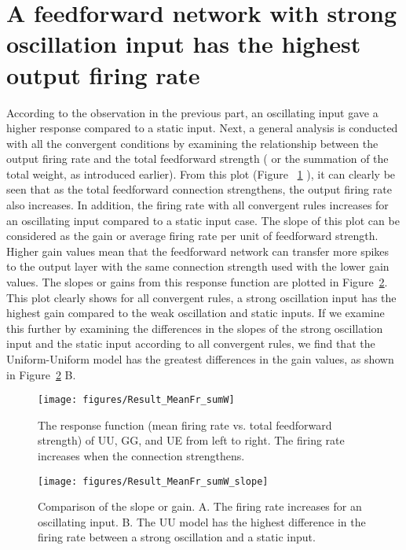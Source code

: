\section{A feedforward network with strong oscillation input has the highest output firing rate}
 According to the observation in the previous part, an oscillating input gave a higher response compared to a static input. Next, a general analysis is conducted with all the convergent conditions by examining the relationship between the output firing rate and the total feedforward strength ( or the summation of the total weight, as introduced earlier).  From this plot (Figure ~\ref{fig:ResFun} ), it can clearly be seen that as the total feedforward connection strengthens, the output firing rate also increases.
 In addition, the firing rate with all convergent rules increases for an oscillating input compared to a static input case. The slope of this plot can be considered as the gain or average firing rate per unit of feedforward strength.  Higher gain values mean that the feedforward network can transfer more spikes to the output layer with the same connection strength used with the lower gain values. The slopes or gains from this response function are plotted in Figure~\ref{fig:ResFunDiff}. This plot clearly shows for all convergent rules, a strong oscillation  input has the highest gain compared to the weak oscillation and static inputs.  If we examine this further by examining the differences in the slopes of the strong oscillation input and the static input according to all convergent rules, we find that the Uniform-Uniform model has the greatest differences in the gain values, as shown in Figure~\ref{fig:ResFunDiff} B. 


\begin{figure}[!h]
	\centering
	\texttt{[image: figures/Result\_MeanFr\_sumW]}
	\caption{The response function (mean firing rate vs. total feedforward strength) of UU, GG, and UE from left to right. The firing rate increases when the connection strengthens.}
	\label{fig:ResFun}
\end{figure}


\begin{figure}[!h]
	\centering
	\texttt{[image: figures/Result\_MeanFr\_sumW\_slope]}
	\caption{Comparison of the slope or gain. A. The firing rate increases for an oscillating input. B. The UU model has the highest difference in the firing rate between a strong oscillation and a static input.}
	\label{fig:ResFunDiff}
\end{figure}



